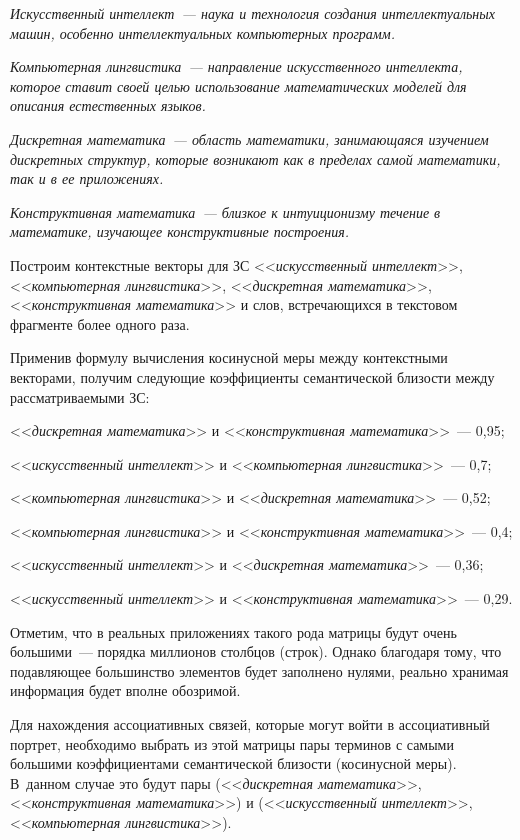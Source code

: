 \begin{multicols}{2}
\textit{Искусственный интеллект~--- наука и технология создания 
интеллектуальных машин, особенно интеллектуальных компьютерных 
программ.}
 
\textit{Компьютерная лингвистика~--- направление искусственного 
интеллекта, которое ставит своей целью использование математических 
моделей для описания естественных языков. }

\textit{Дискретная математика~--- область математики, занимающаяся 
изучением дискретных структур, которые возникают как в пределах 
самой математики, так и в ее приложениях.}

\textit{Конструктивная математика~--- близкое к интуиционизму течение 
в математике, изучающее конструктивные построения.}

     Построим контекстные векторы для ЗС <<\textit{искусственный 
интеллект}>>, <<\textit{компьютерная лингвистика}>>, 
<<\textit{дискретная математика}>>, <<\textit{конструктивная 
математика}>> и слов, встречающихся в текстовом фрагменте более 
одного раза. 
     
     Применив формулу вычисления косинусной меры между 
контекстными векторами, получим следующие коэффициенты 
семантической бли\-зости между рассматриваемыми ЗС:

<<\textit{дискретная математика}>> и <<\textit{конструктивная 
математика}>>~--- 0,95;

<<\textit{искусственный интеллект}>> и <<\textit{компьютерная 
лингвистика}>>~--- 0,7;

<<\textit{компьютерная лингвистика}>> и <<\textit{дискретная 
математика}>>~--- 0,52;

<<\textit{компьютерная лингвистика}>> и <<\textit{конструктивная 
математика}>>~--- 0,4;

<<\textit{искусственный интеллект}>> и <<\textit{дискретная 
математика}>>~--- 0,36;

<<\textit{искусственный интеллект}>> и <<\textit{конструктивная 
математика}>>~--- 0,29.
     
     Отметим, что в реальных приложениях такого рода матрицы будут 
очень большими~--- порядка миллионов столбцов (строк). Однако 
благодаря тому, что подавляющее большинство элементов будет 
заполнено нулями, реально хранимая информация будет вполне 
обозримой. 
     
     Для нахождения ассоциативных связей, которые могут войти в 
ассоциативный портрет, необходимо выбрать из этой матрицы пары 
терминов с самыми большими коэффициентами семантической близости 
(косинусной меры). В~данном случае это будут пары 
(<<\textit{дискретная математика}>>, <<\textit{конструктивная 
математика}>>) и (<<\textit{искусственный интеллект}>>, 
<<\textit{компьютерная лингвистика}>>).


\end{multicols}
